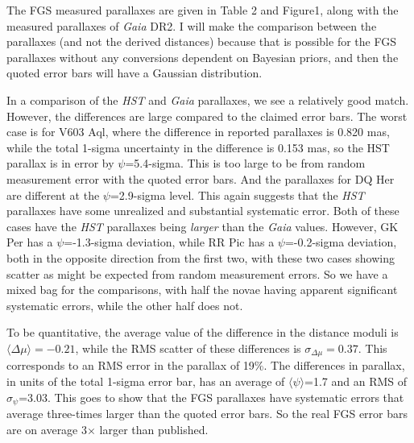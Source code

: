 \documentclass[a4paper,fleqn,usenatbib]{mnras}
\begin{document}
The FGS measured parallaxes are given in Table 2 and Figure1, along with the measured parallaxes of {\it Gaia} DR2.  I will make the comparison between the parallaxes (and not the derived distances) because that is possible for the FGS parallaxes without any conversions dependent on Bayesian priors, and then the quoted error bars will have a Gaussian distribution.

In a comparison of the {\it HST} and {\it Gaia} parallaxes, we see a relatively good match.  However, the differences are large compared to the claimed error bars.  The worst case is for V603 Aql, where the difference in reported parallaxes is 0.820 mas, while the total 1-sigma uncertainty in the difference is 0.153 mas, so the HST parallax is in error by $\psi$=5.4-sigma.  This is too large to be from random measurement error with the quoted error bars.  And the parallaxes for DQ Her are different at the $\psi$=2.9-sigma level.  This again suggests that the {\it HST} parallaxes have some unrealized and substantial systematic error.  Both of these cases have the {\it HST} parallaxes being {\it larger} than the {\it Gaia} values.  However, GK Per has a $\psi$=-1.3-sigma deviation, while RR Pic has a $\psi$=-0.2-sigma deviation, both in the opposite direction from the first two, with these two cases showing scatter as might be expected from random measurement errors.  So we have a mixed bag for the comparisons, with half the novae having apparent significant systematic errors, while the other half does not.

To be quantitative, the average value of the difference in the distance moduli is $\langle \Delta \mu \rangle=-0.21$, while the RMS scatter of these differences is $\sigma _{\Delta \mu} = 0.37$.  This corresponds to an RMS error in the parallax of 19\%.  The differences in parallax, in units of the total 1-sigma error bar, has an average of $\langle \psi \rangle$=1.7 and an RMS of $\sigma_{\psi}$=3.03.  This goes to show that the FGS parallaxes have systematic errors that average three-times larger than the quoted error bars.  So the real FGS error bars are on average 3$\times$ larger than published.
\end{document}
